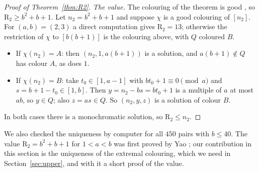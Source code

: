 \documentclass[11pt,a4paper]{article}
\theoremstyle{definition}
\theoremstyle{remark}
\newcommand{\R}{\mathrm{R}}
\begin{document}
\begin{proof}[Proof of Theorem~\ref{thm:R2}]
\emph{The value.} The colouring of the theorem is good \cite{GMT12}, so $\R_2\ge b^2+b+1$. Let $n_2=b^2+b+1$ and suppose $\chi$ is a good colouring of $[n_2]$. For $(a,b)=(2,3)$ a direct computation gives $\R_2=13$; otherwise the restriction of $\chi$ to $[b(b+1)]$ is the colouring above, with $Q$ coloured $B$.
\begin{itemize}
\item If $\chi(n_2)=A$: then $(n_2,1,a(b+1))$ is a solution, and $a(b+1)\notin Q$ has colour $A$, as does $1$.
\item If $\chi(n_2)=B$: take $t_0\in[1,a-1]$ with $bt_0+1\equiv0\pmod a$ and $s=b+1-t_0\in[1,b]$. Then $y=n_2-bs=bt_0+1$ is a multiple of $a$ at most $ab$, so $y\in Q$; also $z=as\in Q$. So $(n_2,y,z)$ is a solution of colour $B$.
\end{itemize}
In both cases there is a monochromatic solution, so $\R_2\le n_2$.
\end{proof}
We also checked the uniqueness by computer for all $450$ pairs with $b\le40$. The value $\R_2=b^2+b+1$ for $1<a<b$ was first proved by Yao \cite{Yao14}; our contribution in this section is the uniqueness of the extremal colouring, which we need in Section~\ref{sec:upper}, and with it a short proof of the value.

\clearpage
\end{document}
